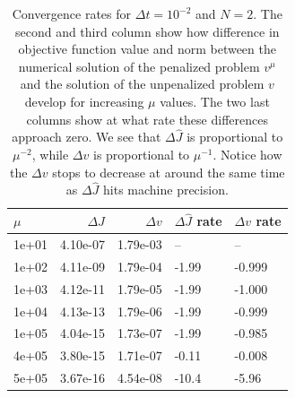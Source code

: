 \begin{table}[!h]
\centering
\caption{Convergence rates for $\Delta t=10^{-2}$ and $N=2$. The second and third column show how difference in objective function value and norm between the numerical solution of the penalized problem $v^{\mu}$ and the solution of the unpenalized problem $v$ develop for increasing $\mu$ values. The two last columns show at what rate these differences approach zero. We see that $\Delta \hat J$ is proportional to $\mu^{-2}$, while $\Delta v$ is proportional to $\mu^{-1}$. Notice how the $\Delta v$ stops to decrease at around the same time as $\Delta \hat J$ hits machine precision.}
\label{Cosn_rate_table}
\begin{tabular}{lrrll}
\toprule
{} $\mu$&  $\Delta \hat J$ &   $\Delta v$ &        $\Delta \hat J$ rate &        $\Delta v$ rate \\
\midrule
1e+01 &      4.10e-07 & 1.79e-03 &            -- &            -- \\
1e+02 &      4.11e-09 & 1.79e-04 & -1.99 & -0.999 \\
1e+03 &      4.12e-11 & 1.79e-05 & -1.99 & -1.000 \\
1e+04 &      4.13e-13 & 1.79e-06 & -1.99 & -0.999 \\
1e+05 &      4.04e-15 & 1.73e-07 & -1.99 & -0.985 \\
4e+05 &      3.80e-15 & 1.71e-07 & -0.11 & -0.008 \\
5e+05 &      3.67e-16 & 4.54e-08 & -10.4 & -5.96 \\
\bottomrule
\end{tabular}
\end{table}
